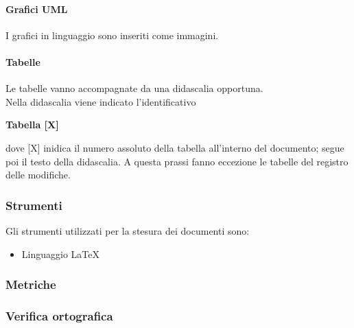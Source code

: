 \paragraph*{Grafici UML}
I grafici in linguaggio  sono inseriti come immagini.
\paragraph*{Tabelle}
Le tabelle vanno accompagnate da una didascalia opportuna.\\
Nella didascalia viene indicato l'identificativo 
\begin{center}
	\textbf{Tabella [X]} 
\end{center}
dove [X] inidica il numero assoluto della tabella all'interno del documento; segue poi il testo della didascalia.
A questa prassi fanno eccezione le tabelle del registro delle modifiche.

\subsubsection{Strumenti} 
Gli strumenti utilizzati per la stesura dei documenti sono:
\begin{itemize}
	\item Linguaggio \LaTeX
\end{itemize}

\subsubsection{Metriche} 
\subsubsection{Verifica ortografica} 

